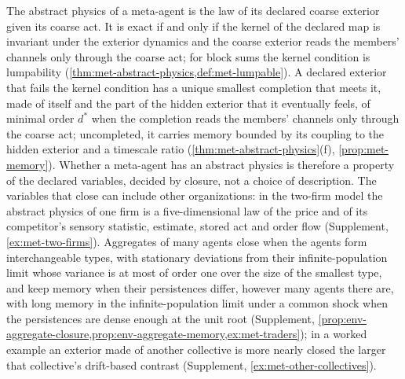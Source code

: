 The abstract physics of a meta-agent is the law of its declared coarse exterior given its coarse act. It is exact if and only if the kernel of the declared map is invariant under the exterior dynamics and the coarse exterior reads the members' channels only through the coarse act; for block sums the kernel condition is lumpability (\cref{thm:met-abstract-physics,def:met-lumpable}). A declared exterior that fails the kernel condition has a unique smallest completion that meets it, made of itself and the part of the hidden exterior that it eventually feels, of minimal order $d^\ast$ when the completion reads the members' channels only through the coarse act; uncompleted, it carries memory bounded by its coupling to the hidden exterior and a timescale ratio (\cref{thm:met-abstract-physics}(f), \cref{prop:met-memory}). Whether a meta-agent has an abstract physics is therefore a property of the declared variables, decided by closure, not a choice of description. The variables that close can include other organizations: in the two-firm model the abstract physics of one firm is a five-dimensional law of the price and of its competitor's sensory statistic, estimate, stored act and order flow (Supplement, \cref{ex:met-two-firms}). Aggregates of many agents close when the agents form interchangeable types, with stationary deviations from their infinite-population limit whose variance is at most of order one over the size of the smallest type, and keep memory when their persistences differ, however many agents there are, with long memory in the infinite-population limit under a common shock when the persistences are dense enough at the unit root (Supplement, \cref{prop:env-aggregate-closure,prop:env-aggregate-memory,ex:met-traders}); in a worked example an exterior made of another collective is more nearly closed the larger that collective's drift-based contrast (Supplement, \cref{ex:met-other-collectives}).

